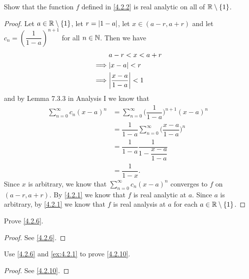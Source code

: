 \begin{ex}\label{ex:4.2.2}
  Show that the function \(f\) defined in \cref{4.2.2} is real analytic on all of \(\mathbb{R} \setminus \{1\}\).
\end{ex}

\begin{proof}
  Let \(a \in \mathbb{R} \setminus \{1\}\), let \(r = \left\lvert1 - a\right\rvert\), let \(x \in (a - r, a + r)\) and let \(c_n = (\dfrac{1}{1 - a})^{n + 1}\) for all \(n \in \mathbb{N}\).
  Then we have
  \begin{align*}
             & a - r < x < a + r              \\
    \implies & \abs{x - a} < r                \\
    \implies & \abs{\dfrac{x - a}{1 - a}} < 1
  \end{align*}
  and by Lemma 7.3.3 in Analysis I we know that
  \begin{align*}
    \sum_{n = 0}^\infty c_n (x - a)^n & = \sum_{n = 0}^\infty \bigg(\dfrac{1}{1 - a}\bigg)^{n + 1} (x - a)^n      \\
                                      & = \dfrac{1}{1 - a} \sum_{n = 0}^\infty \bigg(\dfrac{x - a}{1 - a}\bigg)^n \\
                                      & = \dfrac{1}{1 - a} \dfrac{1}{1 - \dfrac{x - a}{1 - a}}                    \\
                                      & = \dfrac{1}{1 - x}.
  \end{align*}
  Since \(x\) is arbitrary, we know that \(\sum_{n = 0}^\infty c_n (x - a)^n\) converges to \(f\) on \((a - r, a + r)\).
  By \cref{4.2.1} we know that \(f\) is real analytic at \(a\).
  Since \(a\) is arbitrary, by \cref{4.2.1} we know that \(f\) is real analysis at \(a\) for each \(a \in \mathbb{R} \setminus \{1\}\).
\end{proof}

\begin{ex}\label{ex:4.2.3}
  Prove \cref{4.2.6}.
\end{ex}

\begin{proof}
  See \cref{4.2.6}.
\end{proof}

\begin{ex}\label{ex:4.2.4}
  Use \cref{4.2.6} and \cref{ex:4.2.1} to prove \cref{4.2.10}.
\end{ex}

\begin{proof}
  See \cref{4.2.10}.
\end{proof}

